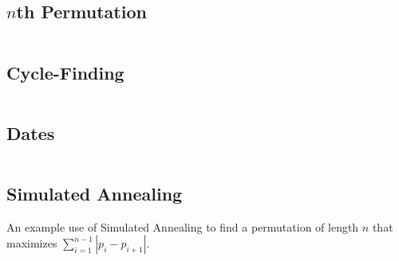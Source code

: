 \documentclass[9pt,a4paper,twocolumn,landscape,oneside]{amsart}
\newcommand{\code}[1]{\inputminted{cpp}{_code/#1}}
\newif\ifverbose
\begin{document}
    \subsection{$n$th Permutation}
        \ifverbose
        A very fast algorithm for computing the $n$th permutation of the list
        $\{0,1,\ldots,k-1\}$.
        \fi
        \code{other/nth_permutation.cpp}

    \subsection{Cycle-Finding}
        \ifverbose
        An implementation of Floyd's Cycle-Finding algorithm.
        \fi
        \code{other/floyds_algorithm.cpp}

    \subsection{Dates}
        \ifverbose
        Functions to simplify date calculations.
        \fi
        \code{other/dates.cpp}

    \subsection{Simulated Annealing}
        An example use of Simulated Annealing to find a permutation of length $n$
        that maximizes $\sum_{i=1}^{n-1}|p_i - p_{i+1}|$.
        \code{other/simulated_annealing.cpp}
\end{document}
